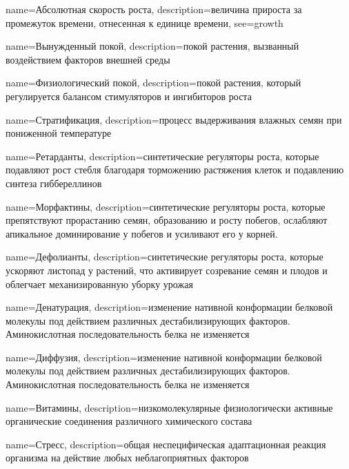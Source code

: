 {
name={Абсолютная скорость роста},
description={величина прироста за промежуток времени, отнесенная к единице времени},
see={growth}
}

{
name={Вынужденный покой},
description={покой растения, вызванный воздействием факторов внешней среды}
}

{
name={Физиологический покой},
description={покой растения, который регулируется балансом стимуляторов и ингибиторов роста}
}

{
name={Стратификация},
description={процесс выдерживания влажных семян при пониженной температуре}
}

{
name={Ретарданты},
description={синтетические регуляторы роста, которые подавляют рост стебля благодаря торможению растяжения клеток и подавлению синтеза гиббереллинов}
}

{
name={Морфактины},
description={синтетические регуляторы роста, которые препятствуют прорастанию семян, образованию и росту побегов, ослабляют апикальное доминирование у побегов и усиливают его у корней.}
}

{
name={Дефолианты},
description={синтетические регуляторы роста, которые ускоряют листопад у растений, что активирует созревание семян и плодов и облегчает механизированную уборку урожая}
}

{
name={Денатурация},
description={изменение нативной конформации белковой молекулы под действием различных дестабилизирующих факторов. Аминокислотная последовательность белка не изменяется}
}

{
name={Диффузия},
description={изменение нативной конформации белковой молекулы под действием различных дестабилизирующих факторов. Аминокислотная последовательность белка не изменяется}
}

{
name={Витамины},
description={низкомолекулярные физиологически активные органические соединения различного химического состава}
}

{
name={Стресс},
description={общая неспецифическая адаптационная реакция организма на действие любых неблагоприятных факторов}
}

